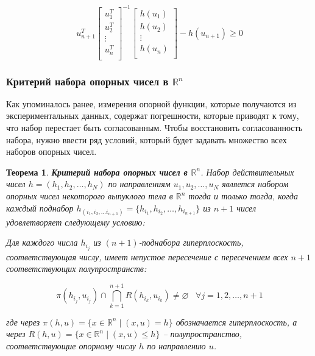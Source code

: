 \documentclass[a4paper, 12pt, titlepage]{article}
\theoremstyle{definition}
\theoremstyle{plain}
\newtheorem{SmartTheorem}{Теорема}
\theoremstyle{plain}
\begin{document}
\begin{equation}
\label{thm:support-function-criterio-ext:condition2}
 u_{n + 1}^{T}
 \left[
 \begin{array}{c}
 u_{1}^{T} \\
 u_{2}^{T} \\
 \vdots \\
 u_{n}^{T} \\
 \end{array}
 \right]^{-1}
 \left[
 \begin{array}{c}
 h(u_{1}) \\
 h(u_{2}) \\
 \vdots \\
 h(u_{n}) \\
 \end{array}
 \right] - h(u_{n + 1}) \geq 0
\end{equation}

\subsubsection{Критерий набора опорных чисел в $\mathbb{R}^{n}$}
\label{sec:support-methods:3d-nonuniform:criterion}

Как упоминалось ранее, измерения опорной функции, которые получаются из
экспериментальных данных, содержат погрешности, которые приводят к тому, что
набор перестает быть согласованным. Чтобы восстановить согласованность набора,
нужно ввести ряд условий, который будет задавать множество всех наборов опорных
чисел.

\begin{SmartTheorem}
 \label{thm:discrete-consistency}
 \textbf{Критерий набора опорных чисел в $\mathbb{R}^{n}$}.
 Набор действительных чисел $h = (h_{1}, h_{2}, \ldots, h_{N})$ по
 направлениям $u_{1}, u_{2}, \ldots, u_{N}$ является набором  опорных чисел
 некоторого выпуклого тела в $\mathbb{R}^{n}$ тогда и только тогда, когда
 каждый поднабор $h_{(i_{1}, i_{2}, \ldots i_{n + 1})} = \{h_{i_{1}}, h_{i_{2}},
 \ldots, h_{i_{n + 1}}\}$ из $n + 1$ чисел удовлетворяет следующему условию:

 Для каждого числа $h_{i_{j}}$ из $(n + 1)$-поднабора гиперплоскость,
 соответствующая числу, имеет непустое пересечение с пересечением всех $n + 1$
 соответствующих полупространств:

 \begin{equation}
 \label{thm:discrete-consistency:condition}
  \pi(h_{i_{j}}, u_{i_{j}}) \cap \bigcap \limits_{k = 1}^{n + 1} R(h_{i_{k}},
  u_{i_{k}}) \neq \varnothing \;\;\; \forall j = 1, 2, \ldots, n + 1
 \end{equation}

 где через
 $\pi(h, u) = \{x \in \mathbb{R}^{n} \; | \; (x, u) = h\}$
 обозначается  гиперплоскость, а через
 $R(h, u) = \{x \in \mathbb{R}^{n} \; | \; (x, u) \leq h\}$
 -- полупространство, соответствующие опорному числу $h$ по направлению $u$.
\end{SmartTheorem}
\end{document}
